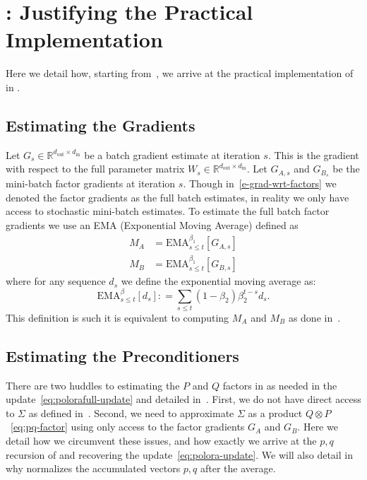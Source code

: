 \section{\methodname{}: Justifying the Practical Implementation}
\label{app:matnormal}
Here we detail how, starting from~, we arrive at the practical  implementation of \methodname{} in .  


\subsection{Estimating the Gradients}
\label{sec:weighted-estimation}
Let $G_s \in \mathbb{R}^{d_{\mathrm{out}} \times d_{\mathrm{in}}}$ be a batch gradient estimate at iteration $s$. This is the gradient with respect to the full parameter matrix $W_s \in  \mathbb{R}^{d_{\mathrm{out}} \times d_{\mathrm{in}}}.$ 
Let $G_{A,s}$ and $G_{B_s}$ be the mini-batch factor gradients at iteration $s$. 
Though in~\eqref{e-grad-wrt-factors}  we denoted the factor gradients as the full batch estimates, in reality we only have access to stochastic mini-batch estimates. To estimate the full batch factor gradients we use an EMA (Exponential Moving Average) defined as 
\begin{align}
    M_A &= \mathrm{EMA}_{s\leq t}^{\beta_1}[G_{A,s}] \\
    M_B &= \mathrm{EMA}_{s\leq t}^{\beta_1}[G_{B,s}] \label{eq:mom-grad-factors}
\end{align}
where for any sequence $d_s$ we define the exponential moving average as:
\[\mathrm{EMA}_{s\leq t}^{\beta}[d_s] : = \sum_{s \leq t }(1-\beta_2)\beta_2^{t-s} d_s. \]
This definition is such it is equivalent to computing $ M_A $ and $ M_B$ as done in~.


\subsection{Estimating the Preconditioners}
\label{sec:kronecker-factor-estimates}
There are two huddles to estimating the $P$ and $Q$ factors in \methodname{} as needed in the update~\eqref{eq:polorafull-update} and detailed in~. First, we do not have direct access to $\Sigma$ as 
defined in~. Second, we need to approximate $\Sigma$ as a product $Q  \otimes P$~\eqref{eq:pq-factor} using only access to the factor gradients $G_A$ and $G_B.$ Here we detail how we circumvent these issues, and how exactly we arrive at the $p,q$
recursion of  and recovering the
update~\eqref{eq:polora-update}. We will also detail in~ 
why  normalizes the accumulated vectors $p,q$ after the
average.


